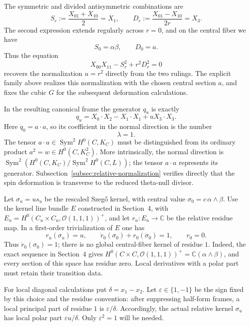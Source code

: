 \documentclass[11pt]{article}
\newcommand{\OO}{\mathcal O}
\begin{document}
The symmetric and divided antisymmetric combinations are
\[
S_r:=\frac{X_{01}+X_{10}}{2}=X_1,
\qquad
D_r:=\frac{X_{01}-X_{10}}{2r}=X_3.
\]
The second expression extends regularly across $r=0$, and on
the central fiber we have
\[
S_0=\alpha\beta,\qquad D_0=a.
\]
Thus the equation
\[
X_{00}X_{11}-S_r^2+r^2D_r^2=0
\]
recovers the normalization $u=r^2$ directly from the two rulings.
The explicit family above realizes this normalization with the
chosen central section $a$, and fixes the cubic $G$ for the
subsequent deformation calculations.
\endgroup

In the resulting canonical frame the generator $q_u$ is exactly
\begin{equation}
\label{eq:quadric-normalized-smoothing}
q_u=X_0\cdot X_2-X_1\cdot X_1+uX_3\cdot X_3.
\end{equation}
Here $\dot q_0=a\cdot a$, so its coefficient in the normal direction is
the number
\begin{equation}
\label{eq:lambda-one}
\lambda=1.
\end{equation}
The tensor $a\cdot a\in\operatorname{Sym}^2H^0(C,K_C)$ must be
distinguished from its ordinary product $a^2=w\in H^0(C,K_C^2)$.
More intrinsically, the normal direction is
$\operatorname{Sym}^2(H^0(C,K_C)/\operatorname{Sym}^2H^0(C,L))$;
the tensor $a\cdot a$ represents its generator.
Subsection~\ref{subsec:relative-normalization} verifies directly that
the spin deformation is transverse to the reduced theta-null divisor.

Let $\sigma_u=us_u$ be the rescaled Szeg\H{o} kernel, with central
value $\sigma_0=c\,\alpha\wedge\beta$. Use the kernel line bundle $E$ constructed in Section~4, with
$E_u=H^0(C_u\times C_u,\OO(1,1,1))^+$, and let
$r_u:E_u\to\mathbb C$ be the relative residue map.
In a first-order trivialization of $E$ one has
\begin{equation}
\label{eq:first-residue-jet}
r_u(\sigma_u)=u,\qquad
\dot r_0(\sigma_0)+r_0(\dot\sigma_0)=1,
\qquad r_0=0.
\end{equation}
Thus $\dot r_0(\sigma_0)=1$; there is no global central-fiber kernel
of residue $1$. Indeed, the exact sequence in Section~4 gives
$H^0(C\times C,\OO(1,1,1))^+=\mathbb C(\alpha\wedge\beta)$, and
every section of this space has residue zero. Local derivatives with
a polar part must retain their transition data.

For local diagonal calculations put $\delta=x_1-x_2$. Let
$\varepsilon\in\{1,-1\}$ be the sign fixed by this choice and the
residue convention: after suppressing half-form frames, a local
principal part of residue $1$ is $\varepsilon/\delta$.
Accordingly, the actual relative kernel $\sigma_u$ has local polar
part $\varepsilon u/\delta$. Only $\varepsilon^2=1$ will be needed.
\endgroup
\end{document}
